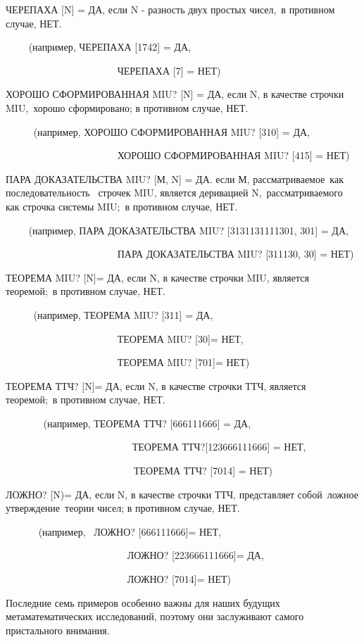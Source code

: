 \documentclass[../main.tex]{subfiles}
\begin{document}
ЧЕРЕПАХА {[}N{]} = ДА, если N - разность двух простых чисел,~в противном случае, НЕТ.

~~~~ (например, ЧЕРЕПАХА {[}1742{]} = ДА,

~~~~~~~~~~~~~~~~~~~~~~ ЧЕРЕПАХА {[}7{]} = НЕТ)

ХОРОШО СФОРМИРОВАННАЯ MIU? {[}N{]} = ДА, если N, в качестве строчки MIU,~хорошо сформировано; в противном случае, НЕТ.

~~~~~ (например, ХОРОШО СФОРМИРОВАННАЯ MIU? {[}310{]} = ДА,

~~~~~~~~~~~~~~~~~~~~~~ ХОРОШО СФОРМИРОВАННАЯ MIU? {[}415{]} = НЕТ)

ПАРА ДОКАЗАТЕЛЬСТВА MIU? {[}М, N{]} = ДА\@. если М, рассматриваемое~как~ последовательность~ строчек MIU, является деривацией N,~рассматриваемого~ как строчка системы MIU;~в противном случае, НЕТ.

~~~~ (например, ПАРА ДОКАЗАТЕЛЬСТВА MIU? {[}3131131111301, 301{]} = ДА,

~~~~~~~~~~~~~~~~~~~~~~ ПАРА ДОКАЗАТЕЛЬСТВА MIU? {[}311130, 30{]} = НЕТ)

ТЕОРЕМА MIU? {[}N{]}= ДА, если N, в качестве строчки MIU, является теоремой;~в противном случае, НЕТ.

~~~~~ (например, ТЕОРЕМА MIU? {[}311{]} = ДА,

~~~~~~~~~~~~~~~~~~~~~~ ТЕОРЕМА MIU? {[}30{]}= НЕТ,

~~~~~~~~~~~~~~~~~~~~~ ~ТЕОРЕМА MIU? {[}701{]}= НЕТ)

ТЕОРЕМА ТТЧ? {[}N{]}= ДА, если N, в качестве строчки ТТЧ, является теоремой;~в противном случае, НЕТ.

~~~~~~~ (например, ТЕОРЕМА ТТЧ? {[}666111666{]} = ДА,

~~~~~~~~~~~~~~~~~~~~~~~~~ ТЕОРЕМА ТТЧ?{[}123666111666{]} = НЕТ,

~~~~~~~~~~~~~~~~~~~~~~~~~~ТЕОРЕМА ТТЧ? {[}7014{]} = НЕТ)

ЛОЖНО? {[}N)= ДА, если N, в качестве строчки ТТЧ, представляет собой~ложное утверждение~теории чисел; в противном случае, НЕТ.

~~~~~~ (например,~ ЛОЖНО? {[}666111666{]}= НЕТ,

~~~~~~~~~~~~~~~~~~~~~~~~ ЛОЖНО? {[}223666111666{]}= ДА,

~~~~~~~~~~~~~~~~~~~~~~~ ~ЛОЖНО? {[}7014{]}= НЕТ)

Последние семь примеров особенно важны для наших будущих метаматематических исследований, поэтому они заслуживают самого пристального внимания.
\end{document}
